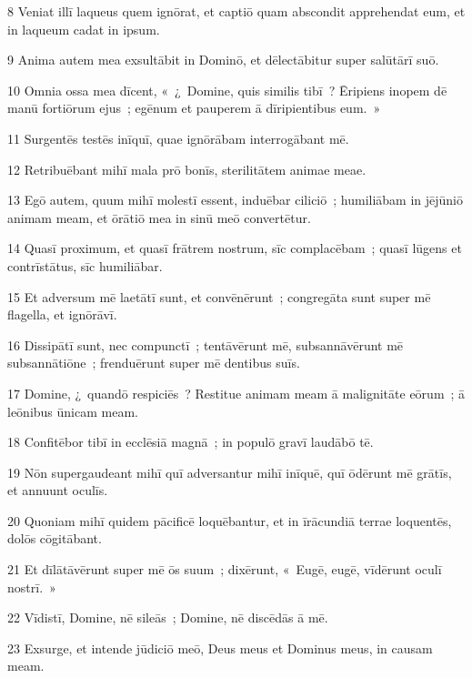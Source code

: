 \psalmVerse
  {\phantom{00}8}
  {Veniat illī laqueus quem ignōrat, et captiō quam abscondit apprehendat eum, et in laqueum cadat in ipsum.}


\psalmVerse
  {\phantom{00}9}
  {Anima autem mea exsultābit in Dominō, et dēlectābitur super salūtārī suō.}


\psalmVerse
  {\phantom{0}10}
  {Omnia ossa mea dīcent, «~¿~Domine, quis similis tibī~? Ēripiens inopem dē manū fortiōrum ejus~; egēnum et pauperem ā dīripientibus eum.~»}


\psalmVerse
  {\phantom{0}11}
  {Surgentēs testēs inīquī, quae ignōrābam interrogābant mē.}


\psalmVerse
  {\phantom{0}12}
  {Retribuēbant mihī mala prō bonīs, sterilitātem animae meae.}


\psalmVerse
  {\phantom{0}13}
  {Egō autem, quum mihī molestī essent, induēbar ciliciō~; humiliābam in jējūniō animam meam, et ōrātiō mea in sinū meō convertētur.}


\psalmVerse
  {\phantom{0}14}
  {Quasī proximum, et quasī frātrem nostrum, sīc complacēbam~; quasī lūgens et contrīstātus, sīc humiliābar.}


\psalmVerse
  {\phantom{0}15}
  {Et adversum mē laetātī sunt, et convēnērunt~; congregāta sunt super mē flagella, et ignōrāvī.}


\psalmVerse
  {\phantom{0}16}
  {Dissipātī sunt, nec compunctī~; tentāvērunt mē, subsannāvērunt mē subsannātiōne~; frenduērunt super mē dentibus suīs.}


\psalmVerse
  {\phantom{0}17}
  {Domine, ¿~quandō respiciēs~? Restitue animam meam ā malignitāte eōrum~; ā leōnibus ūnicam meam.}


\psalmVerse
  {\phantom{0}18}
  {Confitēbor tibī in ecclēsiā magnā~; in populō gravī laudābō tē.}


\psalmVerse
  {\phantom{0}19}
  {Nōn supergaudeant mihī quī adversantur mihī inīquē, quī ōdērunt mē grātīs, et annuunt oculīs.}


\psalmVerse
  {\phantom{0}20}
  {Quoniam mihī quidem pācificē loquēbantur, et in īrācundiā terrae loquentēs, dolōs cōgitābant.}


\psalmVerse
  {\phantom{0}21}
  {Et dīlātāvērunt super mē ōs suum~; dixērunt, «~Eugē, eugē, vīdērunt oculī nostrī.~»}


\psalmVerse
  {\phantom{0}22}
  {Vīdistī, Domine, nē sileās~; Domine, nē discēdās ā mē.}


\psalmVerse
  {\phantom{0}23}
  {Exsurge, et intende jūdiciō meō, Deus meus et Dominus meus, in causam meam.}


